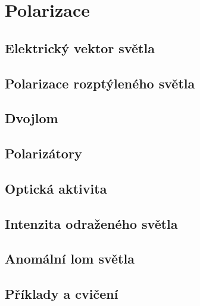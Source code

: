 \chapter{Polarizace}\label{fyz:IchapXXXIII}
\minitoc
  \section{Elektrický vektor světla}\label{fyz:IchapXXXIIIsecI}
  \section{Polarizace rozptýleného světla}\label{fyz:IchapXXXIIIsecII}
  \section{Dvojlom}\label{fyz:IchapXXXIIIsecIII}
  \section{Polarizátory}\label{fyz:IchapXXXIIIsecIV}
  \section{Optická aktivita}\label{fyz:IchapXXXIIIsecV}
  \section{Intenzita odraženého světla}\label{fyz:IchapXXXIIIsecVI}
  \section{Anomální lom světla}\label{fyz:IchapXXXIIIsecVIII}
  \section{Příklady a cvičení}\label{fyz:IchapXXXIIIsecIX}

